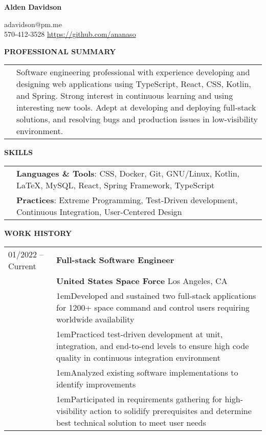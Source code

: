 \documentclass[11pt]{article}
\newlength{\dateColumnWidth}
\newcommand{\customBulletLabel}{\raisebox{0.4ex}{\tiny$\bullet$}}
\def\detail{\par\noindent\makebox[1em][l]{\customBulletLabel}\hangindent1em}
\begin{document}
\begin{center}
\begin{minipage}{0.65\textwidth}
	{\Huge\textbf{Alden Davidson}}
\end{minipage}%
\begin{minipage}{0.35\textwidth}
	\raggedleft
	adavidson@pm.me\\
    570-412-3528
    \url{https://github.com/ananaso}
\end{minipage}
\end{center}
{\Large \textbf{PROFESSIONAL SUMMARY}}
\bigbreak
\begin{tabularx}{\textwidth}{@{}p{\dateColumnWidth}X@{}}
    & Software engineering professional with experience developing and designing web applications using TypeScript, React, CSS, Kotlin, and Spring.
    Strong interest in continuous learning and using interesting new tools.
    Adept at developing and deploying full-stack solutions, and resolving bugs and production issues in low-visibility environment.
\end{tabularx}
\bigbreak
{\Large \textbf{SKILLS}}
\bigbreak
\begin{tabularx}{\textwidth}{@{}p{\dateColumnWidth}X@{}}
    & \textbf{Languages \& Tools}: CSS, Docker, Git, GNU/Linux, Kotlin, \LaTeX, MySQL, React, Spring Framework, TypeScript \\
    & \textbf{Practices}: Extreme Programming, Test-Driven development, Continuous Integration, User-Centered Design
\end{tabularx}
\bigbreak
{\Large \textbf{WORK HISTORY}}
\bigbreak
\begin{tabularx}{\textwidth}{@{}p{\dateColumnWidth}X@{}}
    01/2022 -- Current & \textbf{Full-stack Software Engineer} \\
    & \textbf{United States Space Force} \textbar{} Los Angeles, CA \\
    & \detail Developed and sustained two full-stack applications for 1200+ space command and control users requiring worldwide availability \\
    & \detail Practiced test-driven development at unit, integration, and end-to-end levels to ensure high code quality in continuous integration environment \\
    & \detail Analyzed existing software implementations to identify improvements \\
    & \detail Participated in requirements gathering for high-visibility action to solidify prerequisites and determine best technical solution to meet user needs
\end{tabularx}
\end{document}
